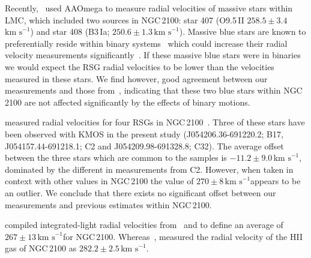 \documentclass[useAMS,usenatbib]{mn2e}
\def\kms{$\mbox{km s}^{-1}$}
\begin{document}
Recently,~\cite{2015arXiv150803490E} used AAOmega to measure radial velocities of massive stars within LMC, which included two sources in NGC\,2100: star 407 (O9.5\,II $258.5\pm3.4$\,\kms) and star 408 (B3\,Ia; $250.6\pm1.3$\,\kms).
Massive blue stars are known to preferentially reside within binary systems~\citep{2012Sci...337..444S} which could increase their radial velocity measurements significantly~\citep{2012A&A...546A..73H}.
If these massive blue stars were in binaries we would expect the RSG radial velocities to be lower than the velocities measured in these stars.
We find however, good agreement between our measurements and those from~\cite{2015arXiv150803490E}, indicating that these two blue stars within NGC\,2100 are not affected significantly by the effects of binary motions.


\citet[henceforth JT94]{1994A&A...282..717J} measured radial velocities for four RSGs in NGC\,2100~\citep[B17, C2, C32 and C34, using the nomenclature of][]{1974A&AS...15..261R}.
Three of these stars have been observed with KMOS in the present study (J054206.36-691220.2; B17, J054157.44-691218.1; C2 and J054209.98-691328.8; C32).
The average offset between the three stars which are common to the samples is $-11.2\pm9.0$\,\kms, dominated by the different in measurements from C2.
However, when taken in context with other values in NGC\,2100 the value of $270\pm8\,$\kms appears to be an outlier.
We conclude that there exists no significant offset between our measurements and previous estimates within NGC\,2100.


\cite{1983ApJ...272..488F} compiled integrated-light radial velocities from~\cite{1972MNRAS.159..445A} and
\cite{1970PhD...........F} to define an average of $267\pm13\,$\kms for NGC\,2100.
Whereas~\cite{1971ApJ...169..271S}, measured the radial velocity of the HII gas of NGC\,2100 as $282.2\pm2.5\,$\kms.


\end{document}
